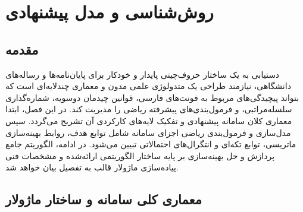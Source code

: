 
\chapter{روش‌شناسی و مدل پیشنهادی}
\label{chap:methodology}

\section{مقدمه}
\label{sec:ch3_intro}

دستیابی به یک ساختار حروف‌چینی پایدار و خودکار برای پایان‌نامه‌ها و رساله‌های دانشگاهی، نیازمند طراحی یک متدولوژی علمی مدون و معماری چندلایه‌ای است که بتواند پیچیدگی‌های مربوط به فونت‌های فارسی، قوانین چیدمان دوسویه، شماره‌گذاری سلسله‌مراتبی، و فرمول‌بندی‌های پیشرفته ریاضی را مدیریت کند. در این فصل، ابتدا معماری کلان سامانه پیشنهادی و تفکیک لایه‌های کارکردی آن تشریح می‌گردد. سپس مدل‌سازی و فرمول‌بندی ریاضی اجزای سامانه شامل توابع هدف، روابط بهینه‌سازی ماتریسی، توابع تکه‌ای و انتگرال‌های احتمالاتی تبیین می‌شود. در ادامه، الگوریتم جامع پردازش و حل بهینه‌سازی بر پایه ساختار الگوریتمی ارائه‌شده و مشخصات فنی پیاده‌سازی ماژولار قالب به تفصیل بیان خواهد شد.

\section{معماری کلی سامانه و ساختار ماژولار}
\label{sec:ch3_architecture}

